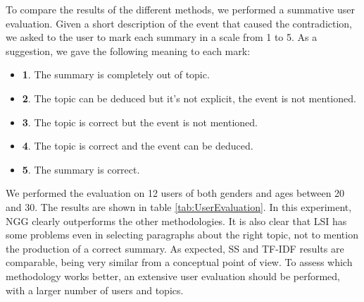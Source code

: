 To compare the results of the different methods, we performed a summative user evaluation. Given a short description of the event that caused the contradiction, we asked to the user to mark each summary in a scale from 1 to 5. As a suggestion, we gave the following meaning to each mark:
\begin{itemize}
\item \textbf{1}. The summary is completely out of topic.
\item \textbf{2}. The topic can be deduced but it's not explicit, the event is not mentioned.
\item \textbf{3}. The topic is correct but the event is not mentioned.
\item \textbf{4}. The topic is correct and the event can be deduced.
\item \textbf{5}. The summary is correct.
\end{itemize}

We performed the evaluation on 12 users of both genders and ages between 20 and 30. The results are shown in table \ref{tab:UserEvaluation}.
In this experiment, NGG clearly outperforms the other methodologies. It is also clear that LSI has some problems even in selecting paragraphs about the right topic, not to mention the production of a correct summary. As expected, SS and TF-IDF results are comparable, being very similar from a conceptual point of view. To assess which methodology works better, an extensive user evaluation should be performed, with a larger number of users and topics.



